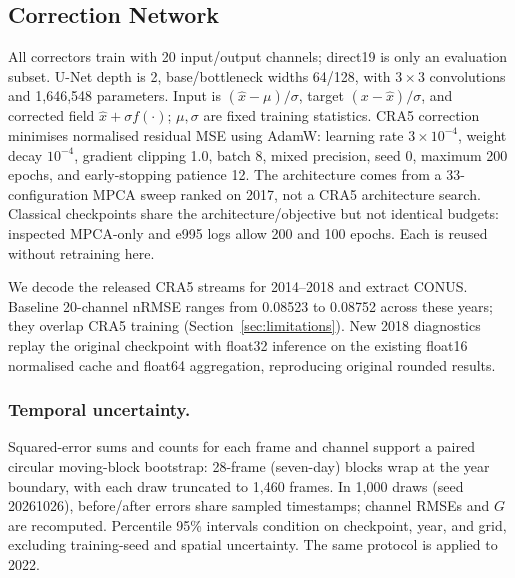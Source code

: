 \subsection{Correction Network}
\label{sec:cnn}
All correctors train with 20 input/output channels; direct19 is only an evaluation
subset. U-Net depth is 2, base/bottleneck widths 64/128, with $3\times3$
convolutions and 1{,}646{,}548 parameters. Input is $(\hat x-\mu)/\sigma$,
target $(x-\hat x)/\sigma$, and corrected field $\hat x+\sigma f(\cdot)$;
$\mu,\sigma$ are fixed training statistics. CRA5 correction minimises normalised
residual MSE using AdamW: learning rate $3\times10^{-4}$, weight decay $10^{-4}$,
gradient clipping 1.0, batch 8, mixed precision, seed 0, maximum 200 epochs,
and early-stopping patience 12. The architecture comes from a 33-configuration
MPCA sweep ranked on 2017, not a CRA5 architecture search. Classical checkpoints
share the architecture/objective but not identical budgets: inspected MPCA-only
and e995 logs allow 200 and 100 epochs. Each is reused without retraining here.

We decode the released CRA5 streams for 2014--2018 and extract CONUS.
Baseline 20-channel nRMSE ranges from 0.08523 to 0.08752 across these years;
they overlap CRA5 training (Section~\ref{sec:limitations}). New 2018 diagnostics
replay the original checkpoint with float32 inference on the existing float16
normalised cache and float64 aggregation, reproducing original rounded results.

\subsubsection{Temporal uncertainty.}
Squared-error sums and counts for each frame and channel support a paired circular
moving-block bootstrap: 28-frame (seven-day) blocks wrap at the year boundary,
with each draw truncated to 1{,}460 frames. In 1{,}000 draws (seed 20261026),
before/after errors share sampled timestamps; channel RMSEs and $G$ are recomputed.
Percentile 95\% intervals condition on checkpoint, year, and grid, excluding
training-seed and spatial uncertainty. The same protocol is applied to 2022.

